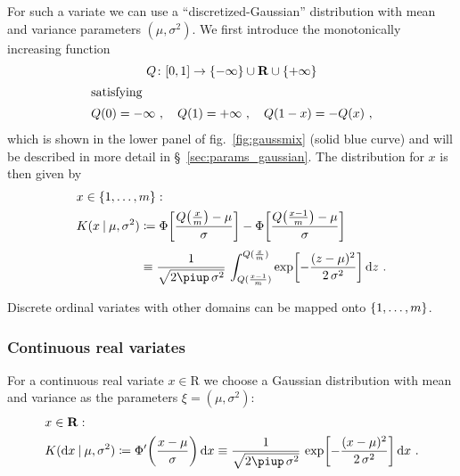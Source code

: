 \documentclass[\ifafour a4paper,12pt,\else a5paper,10pt,\fi%
onecolumn,oneside,article,%
british%
]{memoir}
\theoremstyle{remark}
\theoremstyle{innote}
\newcommand*{\pu}{\piup}%
\newcommand*{\di}{\mathrm{d}}%
\newcommand*{\RR}{\bm{\mathrm{R}}}
\newcommand*{\defd}{\coloneqq}
\DeclarePairedDelimiter\clcl{[}{]}
\DeclarePairedDelimiter\set{\{}{\}} %
\renewcommand*{\|}[1][]{\nonscript\:#1\vert\nonscript\:\mathopen{}}
\newcommand*{\sect}{\S}%
\newcommand*{\fig}{fig.}%
\begin{document}
For such a variate we can use a \enquote{discretized-Gaussian} distribution with mean and variance parameters $(\mu,\sigma^{2})$. We first introduce the monotonically increasing function
\begin{gather}
    \label{eq:Q_function_integer}
    Q\colon \clcl{0,1} \to \set{-\infty}\cup\RR\cup\set{+\infty}
    \\ \shortintertext{satisfying}
    Q(0)=-\infty\ ,\quad Q(1)=+\infty \ ,
    \quad 
    Q(1-x)=-Q(x) \ ,
\end{gather}
which is shown in the lower panel of \fig~\ref{fig:gaussmix} (\textcolor{bluepurple}{solid blue} curve) and will be described in more detail in \sect~\ref{sec:params_gaussian}. The distribution for $x$ is then given by
\begin{equation}
  \label{eq:K_int}
  \begin{split}
    &x \in \set{1,\dotsc, m}:
    \\
    &\!\begin{aligned}
  K(x \| \mu, \sigma^{2}) &\defd
  \Phi\biggl[
  \frac{Q\bigl(\frac{x}{m}\bigr) - \mu}{\sigma}
  \biggr]
  -
  \Phi\biggl[
  \frac{Q\bigl(\frac{x-1}{m}\bigr) - \mu}{\sigma}
  \biggr]
  \\[\jot]&\equiv
  \frac{1}{\sqrt{2\pu\,\sigma^{2}}}\,
  \int_{Q(\frac{x-1}{m})}^{Q(\frac{x}{m})}
  \exp\biggl[-\frac{(z-\mu)^{2}}{2\,\sigma^{2}}\biggr]\, \di z \ .
\end{aligned}
\end{split}
\end{equation}

Discrete ordinal variates with other domains can be mapped onto $\set{1,\dotsc,m}$.

\subsubsection{Continuous real variates}
\label{sec:variates_real}

For a continuous real variate $x \in \RR$ we choose a Gaussian distribution with mean and variance as the parameters $\xi=(\mu, \sigma^{2})$:
\begin{equation}
  \label{eq:K_unb_cont}
  \begin{split}
    &x \in \RR:
    \\
  &K(\di x \| \mu,\sigma^{2}) \defd \Phi'\biggl(\frac{x-\mu}{\sigma}\biggr)\, \di x
  \equiv \frac{1}{\sqrt{2\pu\,\sigma^{2}}}\,
  \exp\biggl[-\frac{(x-\mu)^{2}}{2\,\sigma^{2}}\biggr]\, \di x \ .
\end{split}
\end{equation}
\end{document}
